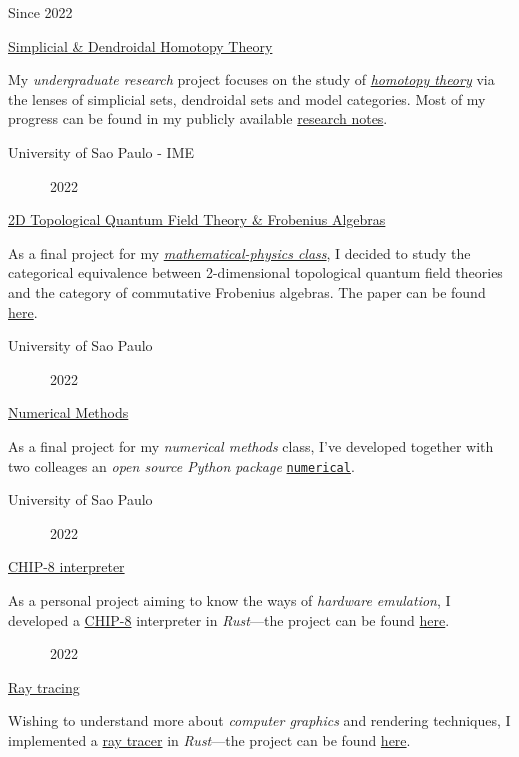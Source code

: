 \documentclass[letterpaper]{twentyonesecondcv} %
\begin{document}
{\begin{twentymid} %
    \twentymiditem
    {Since 2022}{
    \href{https://link.springer.com/book/10.1007/978-3-031-10447-3}
    {\textcolor{mainblue}{Simplicial \& Dendroidal Homotopy Theory}}

    My \emph{undergraduate research} project focuses on the study of
    \href{https://ncatlab.org/nlab/show/Introduction+to+Homotopy+Theory}{\emph{homotopy
      theory}} via the lenses of simplicial sets, dendroidal sets and model
    categories. Most of my progress can be found in my publicly available
    \href{https://luizmugnaini.github.io/deep-dive}{research notes}.

    }{University of Sao Paulo - IME}

    \twentymiditem
    {~~~~~~2022}{
      \href{https://luizmugnaini.github.io/2d-tqft-frobenius}
      {\textcolor{mainblue}{2D Topological Quantum Field Theory \& Frobenius Algebras}}

      As a final project for my
      \href{https://sites.google.com/view/cristian-ortiz/usp2022-math-physics}{\emph{mathematical-physics
          class}}, I decided to study the categorical equivalence between
      2-dimensional topological quantum field theories and the category of
      commutative Frobenius algebras. The paper can be found
      \href{https://luizmugnaini.github.io/2d-tqft-frobenius}{here}.

    }{University of Sao Paulo}

    \twentymiditem
    {~~~~~~2022}{
      \href{https://github.com/luizmugnaini/numerical}
      {\textcolor{mainblue}{Numerical Methods}}

      As a final project for my \emph{numerical methods} class, I've developed
      together with two colleages an \emph{open source Python package}
      \href{https://github.com/luizmugnaini/numerical}{\texttt{numerical}}.

    }{University of Sao Paulo}

    \twentymiditem
    {~~~~~~2022}{
      \href{https://github.com/luizmugnaini/chirp}
      {\textcolor{mainblue}{CHIP-8 interpreter}}

      As a personal project aiming to know the ways of \emph{hardware
        emulation}, I developed
      a \href{https://en.wikipedia.org/wiki/CHIP-8}{CHIP-8} interpreter in
      \emph{Rust}---the project can be
      found \href{https://github.com/luizmugnaini/chirp}{here}.

    }{}

    \twentymiditem
    {~~~~~~2022}{
      \href{https://github.com/luizmugnaini/radiant}
      {\textcolor{mainblue}{Ray tracing}}

      Wishing to understand more about \emph{computer graphics} and rendering
      techniques, I implemented
      a \href{https://en.wikipedia.org/wiki/Ray_tracing_(graphics)}{ray tracer}
      in \emph{Rust}---the project can be
      found \href{https://github.com/luizmugnaini/radiant}{here}.

    }{}

\end{twentymid}

}
\end{document}
